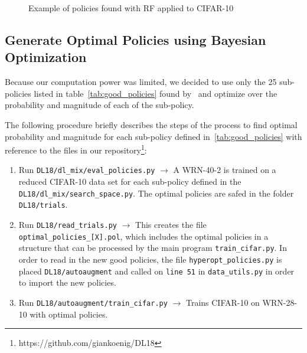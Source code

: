 \documentclass[10pt,twocolumn,letterpaper]{article}
\begin{document}
\begin{figure}
	\centering
	\caption{Example of policies found with RF applied to CIFAR-10}
	\label{fig:PolicyExample}
\end{figure}

\subsection{Generate Optimal Policies using Bayesian Optimization}
Because our computation power was limited, we decided to use only the 25 sub-policies listed in table~\ref{tab:good_policies} found by~\cite{Ekin} and optimize over the probability and magnitude of each of the sub-policy.

The following procedure briefly describes the steps of the process to find optimal probability and magnitude for each sub-policy defined in~\ref{tab:good_policies} with reference to the files in our repository\footnote{https://github.com/giankoenig/DL18}:

\begin{enumerate}
\item Run \texttt{DL18/dl\_mix/eval\_policies.py} $\rightarrow$ A WRN-40-2 is trained on a reduced CIFAR-10 data set for each sub-policy defined in the \texttt{DL18/dl\_mix/search\_space.py}. The optimal policies are safed in the folder \texttt{DL18/trials}.
\item Run \texttt{DL18/read\_trials.py} $\rightarrow$ This creates the file \texttt{optimal\_policies\_[X].pol}, which includes the optimal policies in a structure that can be processed by the main program \texttt{train\_cifar.py}. In order to read in the new good policies, the file \texttt{hyperopt\_policies.py} is placed \texttt{DL18/autoaugment} and called on \texttt{line 51} in \texttt{data\_utils.py} in order to import the new policies.
\item Run \texttt{DL18/autoaugment/train\_cifar.py} $\rightarrow$  Trains CIFAR-10 on WRN-28-10 with optimal policies.
\end{enumerate}
\end{document}

